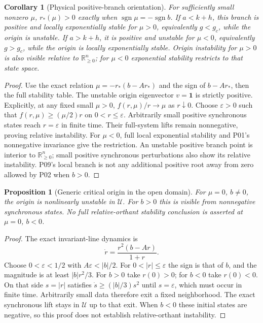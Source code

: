 \documentclass[11pt]{article}
\newcommand{\R}{\mathbb{R}}
\newcommand{\one}{\mathbf{1}}
\newcommand{\Orth}{\R_{\geq 0}^{n}}
\newcommand{\Domain}{\mathcal{U}}
\newtheorem{proposition}[theorem]{Proposition}
\newtheorem{corollary}[theorem]{Corollary}
\theoremstyle{definition}
\theoremstyle{remark}
\begin{document}
\begin{corollary}[Physical positive-branch orientation]
\label{cor:P09-physical}
For sufficiently small nonzero $\mu$, $r_*(\mu)>0$ exactly when
$\operatorname{sgn}\mu=-\operatorname{sgn}b$.
If $a<k+h$, this branch is positive and locally exponentially stable
for $\mu>0$, equivalently $g<g_c$, while the origin is unstable.
If $a>k+h$, it is positive and unstable for $\mu<0$, equivalently
$g>g_c$, while the origin is locally exponentially stable.
Origin instability for $\mu>0$ is also visible relative to $\Orth$;
for $\mu<0$ exponential stability restricts to that state space.
\end{corollary}
\begin{proof}
Use the exact relation $\mu=-r_*(b-Ar_*)$ and the sign of $b-Ar_*$,
then the full stability table. The unstable origin eigenvector
$v=\one$ is strictly positive. Explicitly, at any fixed small $\mu>0$,
$f(r,\mu)/r\to\mu$ as $r\downarrow0$. Choose $\varepsilon>0$ such
that $f(r,\mu)\ge(\mu/2)r$ on $0<r\le\varepsilon$.
Arbitrarily small positive synchronous states reach $r=\varepsilon$
in finite time. Their full-system lifts remain nonnegative, proving
relative instability. For $\mu<0$, full local exponential stability
and P01's nonnegative invariance give the restriction. An unstable
positive branch point is interior to $\Orth$; small positive synchronous
perturbations also show its relative instability. P09's local branch
is not any additional positive root away from zero allowed by P02
when $b>0$.
\end{proof}

\begin{proposition}[Generic critical origin in the open domain]
\label{prop:P09-generic-critical}
For $\mu=0$, $b\ne0$, the origin is nonlinearly unstable in $\Domain$.
For $b>0$ this is visible from nonnegative synchronous states.
No full relative-orthant stability conclusion is asserted at
$\mu=0$, $b<0$.
\end{proposition}
\begin{proof}
The exact invariant-line dynamics is
\begin{equation}
 \dot r=\frac{r^2(b-Ar)}{1+r}.\label{eq:P09-generic-critical}
\end{equation}
Choose $0<\varepsilon<1/2$ with $A\varepsilon<|b|/2$.
For $0<|r|\le\varepsilon$ the sign is that of $b$, and the magnitude
is at least $|b|r^2/3$. For $b>0$ take $r(0)>0$; for $b<0$ take
$r(0)<0$. On that side $s=|r|$ satisfies
$\dot s\ge(|b|/3)s^2$ until $s=\varepsilon$, which must occur in
finite time. Arbitrarily small data therefore exit a fixed neighborhood.
The exact synchronous lift stays in $\Domain$ up to that exit.
When $b<0$ these initial states are negative, so this proof does not
establish relative-orthant instability.
\end{proof}
\end{document}
